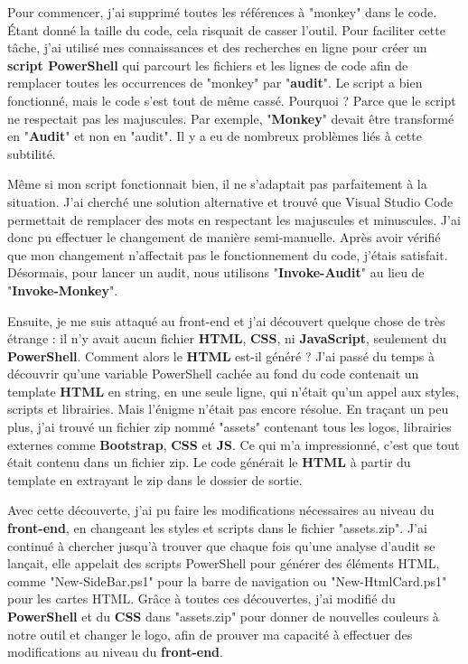 Pour commencer, j'ai supprimé toutes les références à "monkey" dans le code. Étant donné la taille du code, cela risquait de casser l'outil. Pour faciliter cette tâche, j'ai utilisé mes connaissances et des recherches en ligne pour créer un \textbf{script PowerShell} qui parcourt les fichiers et les lignes de code afin de remplacer toutes les occurrences de "monkey" par "\textbf{audit}". Le script a bien fonctionné, mais le code s'est tout de même cassé. Pourquoi ? Parce que le script ne respectait pas les majuscules. Par exemple, "\textbf{Monkey}" devait être transformé en "\textbf{Audit}" et non en "audit". Il y a eu de nombreux problèmes liés à cette subtilité.

Même si mon script fonctionnait bien, il ne s'adaptait pas parfaitement à la situation. J'ai cherché une solution alternative et trouvé que Visual Studio Code permettait de remplacer des mots en respectant les majuscules et minuscules. J'ai donc pu effectuer le changement de manière semi-manuelle. Après avoir vérifié que mon changement n'affectait pas le fonctionnement du code, j'étais satisfait. Désormais, pour lancer un audit, nous utilisons "\textbf{Invoke-Audit}" au lieu de "\textbf{Invoke-Monkey}".

Ensuite, je me suis attaqué au front-end et j'ai découvert quelque chose de très étrange : il n'y avait aucun fichier \textbf{HTML}, \textbf{CSS}, ni \textbf{JavaScript}, seulement du \textbf{PowerShell}. Comment alors le \textbf{HTML} est-il généré ? J'ai passé du temps à découvrir qu'une variable PowerShell cachée au fond du code contenait un template \textbf{HTML} en string, en une seule ligne, qui n'était qu'un appel aux styles, scripts et librairies. Mais l'énigme n'était pas encore résolue. En traçant un peu plus, j'ai trouvé un fichier zip nommé "assets" contenant tous les logos, librairies externes comme \textbf{Bootstrap}, \textbf{CSS} et \textbf{JS}. Ce qui m'a impressionné, c'est que tout était contenu dans un fichier zip. Le code générait le \textbf{HTML} à partir du template en extrayant le zip dans le dossier de sortie.

Avec cette découverte, j'ai pu faire les modifications nécessaires au niveau du \textbf{front-end}, en changeant les styles et scripts dans le fichier "assets.zip". J'ai continué à chercher jusqu'à trouver que chaque fois qu'une analyse d'audit se lançait, elle appelait des scripts PowerShell pour générer des éléments HTML, comme "New-SideBar.ps1" pour la barre de navigation ou "New-HtmlCard.ps1" pour les cartes HTML. Grâce à toutes ces découvertes, j'ai modifié du \textbf{PowerShell} et du \textbf{CSS} dans "assets.zip" pour donner de nouvelles couleurs à notre outil et changer le logo, afin de prouver ma capacité à effectuer des modifications au niveau du \textbf{front-end}.

